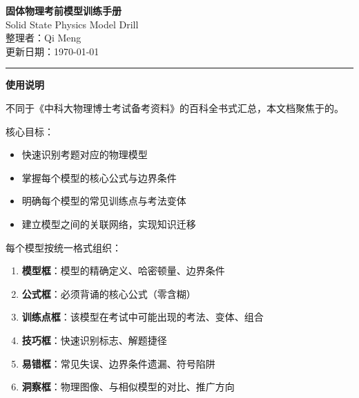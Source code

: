 



\begin{center}
{\Huge\bfseries\sffamily\color{ustcblue} 固体物理考前模型训练手册}\\[8pt]
{\Large Solid State Physics Model Drill}\\[12pt]
{\large 整理者：Qi Meng}\\[4pt]
{\normalsize 更新日期：\today}
\end{center}

\vspace{8pt}
\textcolor{ustcblue}{\rule{\linewidth}{2pt}}
\vspace{8pt}

\begin{center}
{\LARGE\bfseries\color{ustcblue} 使用说明}
\end{center}

\vspace{6pt}

\begin{insightbox}[本文档的定位]
不同于《中科大物理博士考试备考资料》的百科全书式汇总，本文档聚焦于的。

核心目标：
\begin{itemize}
    \item 快速识别考题对应的物理模型
    \item 掌握每个模型的核心公式与边界条件
    \item 明确每个模型的常见训练点与考法变体
    \item 建立模型之间的关联网络，实现知识迁移
\end{itemize}
\end{insightbox}

\vspace{4pt}

\begin{drillbox}[阅读指南]
每个模型按统一格式组织：
\begin{enumerate}[label=\textbf{\arabic*.}]
    \item \textcolor{modelteal}{\textbf{模型框}}：模型的精确定义、哈密顿量、边界条件
    \item \textcolor{successgreen}{\textbf{公式框}}：必须背诵的核心公式（零含糊）
    \item \textcolor{drillblue}{\textbf{训练点框}}：该模型在考试中可能出现的考法、变体、组合
    \item \textcolor{alertred}{\textbf{技巧框}}：快速识别标志、解题捷径
    \item \textcolor{errorred}{\textbf{易错框}}：常见失误、边界条件遗漏、符号陷阱
    \item \textcolor{royalpurple}{\textbf{洞察框}}：物理图像、与相似模型的对比、推广方向
\end{enumerate}
\end{drillbox}

